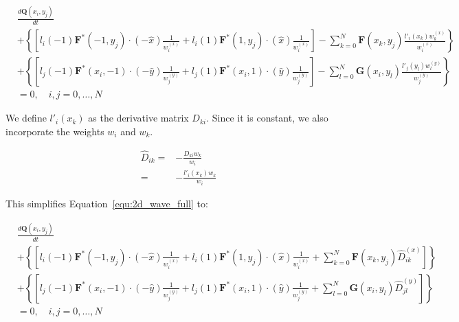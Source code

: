\begin{equation} \label{equ:2d_wave_full}
	\begin{split}
        & \frac{d\mathbf{Q}(x_i, y_j)}{dt} \\
        & + \left \{ \left[ l_i \left( -1 \right) \mathbf{F}^* \left( -1, y_j \right) \cdot \left( -\widehat{x} \right) \frac{1}{w_i^{ \left( x \right) }} + l_i \left( 1 \right) \mathbf{F}^* \left( 1, y_j \right) \cdot
        \left( \widehat{x} \right) \frac{1}{w_i^{ \left( x \right) }} \right] - \sum_{k = 0}^{N} \mathbf{F} \left(x_k, y_j \right) \frac{l'_i \left( x_k \right) w_k^{ \left( x \right) }}{w_i^{ \left( x \right) }} \right \} \\
        & + \left \{ \left[ l_j \left( -1 \right) \mathbf{F}^* (x_i, -1) \cdot \left( -\widehat{y} \right) \frac{1}{w_j^{ \left( y \right) }} + l_j \left( 1 \right) \mathbf{F}^*(x_i, 1) \cdot
        \left( \widehat{y} \right) \frac{1}{w_j^{ \left( y \right) }} \right] - \sum_{l = 0}^{N} \mathbf{G} \left(x_i, y_l \right) \frac{l'_j \left( y_l \right) w_l^{ \left( y \right) }}{w_j^{ \left( y \right) }} \right \} \\
        & = 0, \quad i,j = 0, \ldots, N
	\end{split} 
\end{equation}

We define \(l'_i(x_k)\) as the derivative matrix \(D_{k i}\). Since it is constant, we also
incorporate the weights \(w_i\) and \(w_k\).

\begin{equation} \label{equ:d_hat}
	\begin{split}
        \widehat{D}_{i k} = & -\frac{D_{k i} w_k}{w_i} \\
        = & -\frac{l'_i(x_k) w_k}{w_i}
	\end{split} 
\end{equation}

This simplifies Equation~\ref{equ:2d_wave_full} to:

\begin{equation} \label{equ:2d_wave_d}
	\begin{split}
        & \frac{d\mathbf{Q}(x_i, y_j)}{dt} \\
        & + \left \{ \left[ l_i \left( -1 \right) \mathbf{F}^* \left( -1, y_j \right) \cdot \left( -\widehat{x} \right) \frac{1}{w_i^{ \left( x \right) }} + l_i \left( 1 \right) \mathbf{F}^* \left( 1, y_j \right) \cdot
        \left( \widehat{x} \right) \frac{1}{w_i^{ \left( x \right) }} + \sum_{k = 0}^{N} \mathbf{F} \left( x_k, y_j \right) \widehat{D}_{i k}^{ \left( x \right) } \right] \right \} \\
        & + \left \{ \left [ l_j \left( -1 \right) \mathbf{F}^* \left( x_i, -1 \right) \cdot \left( -\widehat{y} \right) \frac{1}{w_j^{ \left( y \right) }} + l_j \left( 1 \right) \mathbf{F}^* \left(x_i, 1 \right) \cdot
        \left( \widehat{y} \right) \frac{1}{w_j^{ \left( y \right) }} + \sum_{l = 0}^{N} \mathbf{G} \left( x_i, y_l \right) \widehat{D}_{j l}^{ \left( y \right) } \right] \right \} \\
        & = 0, \quad i,j = 0, \ldots, N
	\end{split}
\end{equation}

